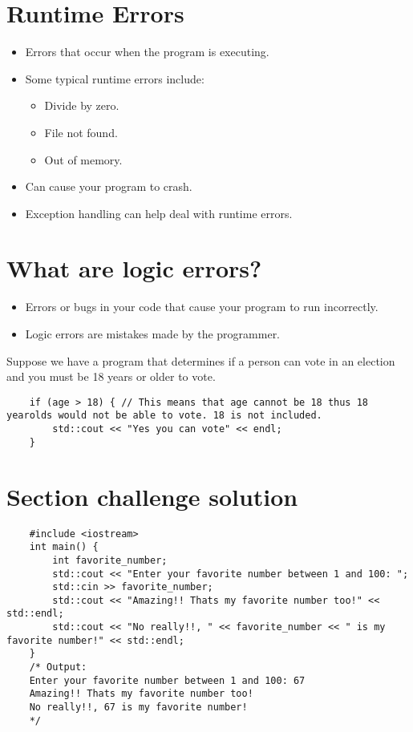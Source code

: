 \section{Runtime Errors}
\begin{itemize}
    \item Errors that occur when the program is executing.
    \item Some typical runtime errors include:
        \begin{itemize}
            \item Divide by zero.
            \item File not found.
            \item Out of memory.
        \end{itemize}
    
    \item Can cause your program to crash.
    \item Exception handling can help deal with runtime errors.
\end{itemize}

\section{What are logic errors?}
\begin{itemize}
    \item Errors or bugs in your code that cause your program to run incorrectly.
    \item Logic errors are mistakes made by the programmer.
\end{itemize}
Suppose we have a program that determines if a person can vote in an election and you must be 18 years or older to vote.
\begin{verbatim}
    if (age > 18) { // This means that age cannot be 18 thus 18 yearolds would not be able to vote. 18 is not included.
        std::cout << "Yes you can vote" << endl;
    }
\end{verbatim}

\section{Section challenge solution}
\begin{verbatim}
    #include <iostream>
    int main() {
        int favorite_number;
        std::cout << "Enter your favorite number between 1 and 100: ";
        std::cin >> favorite_number;
        std::cout << "Amazing!! Thats my favorite number too!" << std::endl;
        std::cout << "No really!!, " << favorite_number << " is my favorite number!" << std::endl;
    }
    /* Output:
    Enter your favorite number between 1 and 100: 67
    Amazing!! Thats my favorite number too!
    No really!!, 67 is my favorite number!
    */
\end{verbatim}
